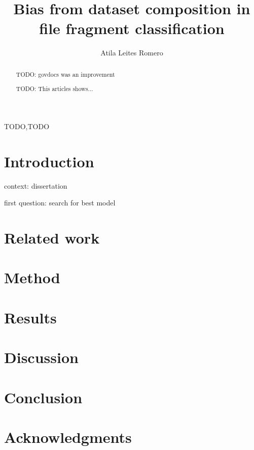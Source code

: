\documentclass[review]{elsarticle}
\begin{document}
\begin{frontmatter}

\title{Bias from dataset composition in file fragment classification}

\author[mymainaddress,mysecondaryaddress]{Atila Leites Romero}

\address[mymainaddress]{PUC}
\address[mysecondaryaddress]{Brazilian Federal Police, Av Ipiranga 1365, Porto Alegre/RS, Brazil}






\begin{abstract}
TODO: govdocs was an improvement

TODO: This articles shows...
\end{abstract}

\begin{keyword}
TODO\sep TODO
\end{keyword}

\end{frontmatter}

\linenumbers

\section{Introduction}

context: dissertation

first question: search for best model

\section{Related work}


\section{Method}


\section{Results}


\section{Discussion}


\section{Conclusion}


\section{Acknowledgments}




\end{document}
